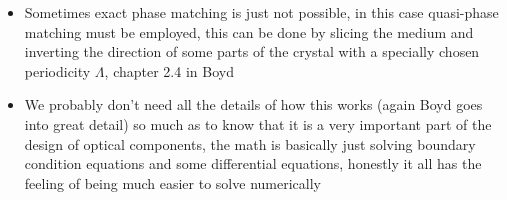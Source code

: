 \documentclass[english]{article}
\begin{document}
\begin{itemize}
\item Sometimes exact phase matching is just not possible, in this case quasi-phase matching must be employed, this can be done by slicing the medium and inverting the direction of some parts of the crystal with a specially chosen periodicity $\Lambda$, chapter 2.4 in Boyd
\item We probably don't need all the details of how this works (again Boyd goes into great detail) so much as to know that it is a very important part of the design of optical components, the math is basically just solving boundary condition equations and some differential equations, honestly it all has the feeling of being much easier to solve numerically 
\end{itemize}
\end{document}
